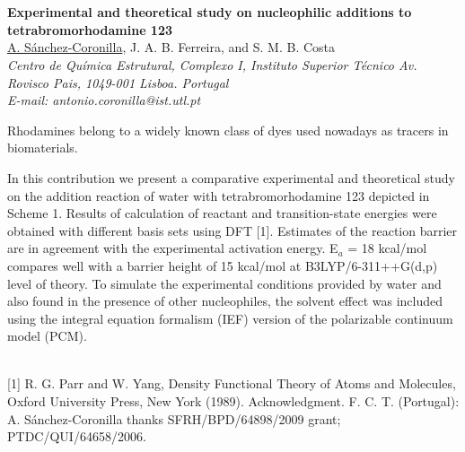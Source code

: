 \section*{}
\begin{center}
{\bf \Large
Experimental and theoretical study on nucleophilic
additions to tetrabromorhodamine 123
}
\\
\vspace{0.5cm}
\underline{A. Sánchez-Coronilla}, J. A. B. Ferreira, and S. M. B. Costa
\\
\vspace{0.5cm}
{\it
Centro de Química Estrutural, Complexo I, Instituto Superior Técnico
Av. Rovisco Pais, 1049-001 Lisboa. Portugal
}
\\
\vspace{0.5cm}
{\it E-mail: antonio.coronilla@ist.utl.pt}
\\
\vspace{0.5cm}
\end{center}
Rhodamines belong to a widely known class of dyes used nowadays as
tracers in biomaterials.

In this contribution we present a comparative experimental and theoretical
study on the addition reaction of water with tetrabromorhodamine 123 depicted in
Scheme 1. Results of calculation of reactant and transition-state energies were
obtained with different basis sets using DFT [1]. Estimates of the reaction barrier are
in agreement with the experimental activation energy. E$_{a}$ = 18 kcal/mol compares
well with a barrier height of 15 kcal/mol at B3LYP/6-311++G(d,p) level of theory.
To simulate the experimental conditions provided by water and also found in the
presence of other nucleophiles, the solvent effect was included using the integral
equation formalism (IEF) version of the polarizable continuum model (PCM).
\\
\renewcommand{\figurename}{Scheme}
\begin{figure}[h]
 \centerline{}
 \caption[]{}\label{figure 1}
\end{figure}
\renewcommand{\figurename}{Figure}
\\
{\footnotesize
[1] R. G. Parr and W. Yang, Density Functional Theory of Atoms and Molecules, Oxford University
Press, New York (1989).
\newline
Acknowledgment. F. C. T. (Portugal): A. Sánchez-Coronilla thanks SFRH/BPD/64898/2009 grant; PTDC/QUI/64658/2006.
}


